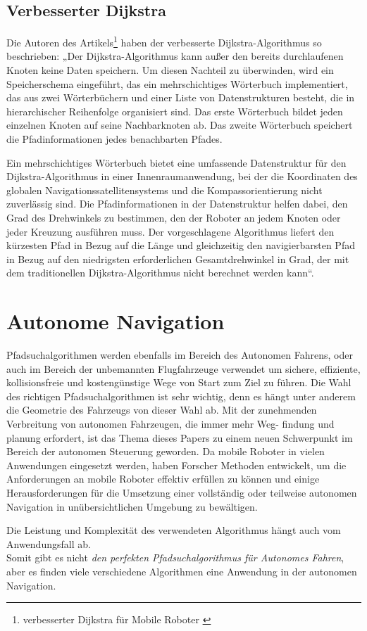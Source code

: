 \subsection{Verbesserter Dijkstra }
Die Autoren des Artikels\footnote{ verbesserter Dijkstra für Mobile Roboter \cite{Karur2021}} haben der verbesserte Dijkstra-Algorithmus so beschrieben:
„Der Dijkstra-Algorithmus kann außer den bereits durchlaufenen Knoten keine Daten speichern. Um diesen Nachteil zu überwinden, wird ein Speicherschema eingeführt, das ein mehrschichtiges Wörterbuch implementiert, das aus zwei Wörterbüchern und einer Liste von Datenstrukturen besteht, die in hierarchischer Reihenfolge organisiert sind. Das erste Wörterbuch bildet jeden einzelnen Knoten auf seine Nachbarknoten ab. Das zweite Wörterbuch speichert die Pfadinformationen jedes benachbarten Pfades.
\newline
\newline

Ein mehrschichtiges Wörterbuch bietet eine umfassende Datenstruktur für den Dijkstra-Algorithmus in einer Innenraumanwendung, bei der die Koordinaten des globalen Navigationssatellitensystems und die Kompassorientierung nicht zuverlässig sind. Die Pfadinformationen in der Datenstruktur helfen dabei, den Grad des Drehwinkels zu bestimmen, den der Roboter an jedem Knoten oder jeder Kreuzung ausführen muss. Der vorgeschlagene Algorithmus liefert den kürzesten Pfad in Bezug auf die Länge und gleichzeitig den navigierbarsten Pfad in Bezug auf den niedrigsten erforderlichen Gesamtdrehwinkel in Grad, der mit dem traditionellen Dijkstra-Algorithmus nicht berechnet werden kann“.

\section{Autonome Navigation}
\label{Autonome Navigation}

Pfadsuchalgorithmen werden ebenfalls im Bereich des Autonomen Fahrens, oder auch im Bereich der unbemannten Flugfahrzeuge verwendet
um sichere, effiziente, kollisionsfreie und kostengünstige Wege von Start zum Ziel zu führen. Die Wahl des richtigen Pfadsuchalgorithmen
ist sehr wichtig, denn es hängt unter anderem die Geometrie des Fahrzeugs von dieser Wahl ab.
Mit der zunehmenden Verbreitung von autonomen Fahrzeugen, die immer mehr Weg- findung und planung erfordert, ist das Thema dieses Papers 
zu einem neuen Schwerpunkt im Bereich der autonomen Steuerung geworden.
Da mobile Roboter in vielen Anwendungen eingesetzt werden, haben Forscher Methoden entwickelt, um die 
Anforderungen an mobile Roboter effektiv erfüllen zu können und einige Herausforderungen für die Umsetzung einer vollständig oder
teilweise autonomen Navigation in unübersichtlichen Umgebung zu bewältigen.\cite{Karur:21}

Die Leistung und Komplexität des verwendeten Algorithmus hängt auch vom Anwendungsfall ab. \cite{Karur:21}\\
Somit gibt es nicht \emph{den perfekten Pfadsuchalgorithmus für Autonomes Fahren}, aber es finden viele verschiedene Algorithmen eine 
Anwendung in der autonomen Navigation.